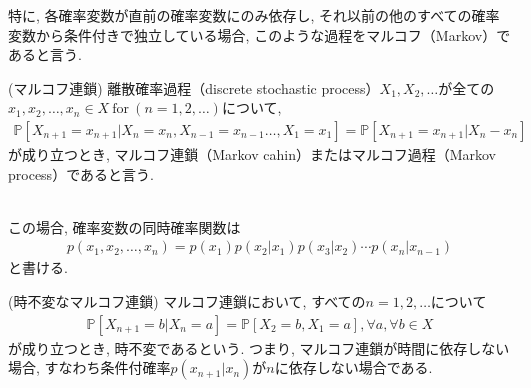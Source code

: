 \documentclass[a4j]{jsarticle}
\begin{document}
特に, 各確率変数が直前の確率変数にのみ依存し, それ以前の他のすべての確率変数から条件付きで独立している場合, このような過程をマルコフ（Markov）であると言う. \\

\begin{itembox}[l]{ (マルコフ連鎖)}
	離散確率過程（discrete stochastic process）$X_1, X_2, \ldots$が全ての$x_1, x_2, \ldots, x_n \in X \: \mbox{for} \: (n =1, 2, \ldots)$について,
	\begin{align}
		\mathbb{P}[X_{n+1} = x_{n+1} | X_n =x_n, X_{n-1} = x_{n-1} \ldots, X_1 = x_1] = \mathbb{P}[X_{n+1} = x_{n+1} | X_n - x_n]
	\end{align}
	が成り立つとき, マルコフ連鎖（Markov cahin）またはマルコフ過程（Markov process）であると言う.
\end{itembox}\\

この場合, 確率変数の同時確率関数は
\begin{align}
	p(x_1, x_2, \ldots, x_n) = p(x_1)p(x_2|x_1)p(x_3|x_2) \dotsm p(x_n|x_{n-1})
\end{align}
と書ける.\\

\begin{itembox}[l]{ (時不変なマルコフ連鎖)}
	マルコフ連鎖において, すべての$n = 1, 2, \ldots$について
	\begin{align}
		\mathbb{P}[X_{n+1} = b | X_n = a] = \mathbb{P}[X_2 = b, X_1 = a], \forall a, \forall b \in X
	\end{align}
	が成り立つとき, 時不変であるという.
	つまり, マルコフ連鎖が時間に依存しない場合, すなわち条件付確率$p(x_{n+1}|x_n)$が$n$に依存しない場合である.
\end{itembox}\\
\end{document}
